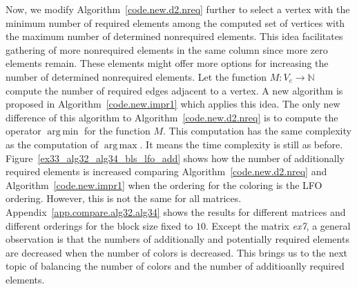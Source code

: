 \documentclass[12pt, twoside,a4paper,toc=bibliography]{scrbook}
\DeclareMathOperator*{\argmin}{arg\,min}
\DeclareMathOperator*{\argmax}{arg\,max}
\newcommand{\figref}[1]{Figure~\protect\ref{#1}}
\newcommand{\coderef}[1]{Algorithm~\protect\ref{#1}}
\newcommand{\appref}[1]{Appendix~\protect\ref{#1}}
\newcommand{\req}{M}
\begin{document}
Now, we modify \coderef{code.new.d2.nreq} further to select a vertex with the minimum number of 
required elements among the computed set of vertices with the maximum number of determined nonrequired elements.
This idea facilitates gathering of more nonrequired elements in the same column since
more zero elements remain. These elements might offer more options for increasing the number of determined
nonrequired elements.
Let the function $\req: V_c\rightarrow \mathbb{N}$ compute the number of required edges adjacent to a vertex.
A new algorithm is proposed in \coderef{code.new.impr1} which applies this idea. 
The only new difference of this algorithm to \coderef{code.new.d2.nreq} 
is to compute the operator $\argmin$ for the 
function $\req$. This computation has the same complexity as the computation of $\argmax$.
It means the time complexity is still as before.
\figref{ex33_alg32_alg34_bls_lfo_add} shows how the number of additionally
required elements is increased comparing
\coderef{code.new.d2.nreq} and \coderef{code.new.impr1} when the ordering for the coloring
is the LFO ordering. However, this is not the same for all matrices. 
\appref{app.compare.alg32.alg34} shows the results for different matrices
and different orderings for the block size fixed to $10$.
Except the matrix \textit{ex7},
a general observation is that the numbers of additionally and potentially required elements
are decreased when the number of colors is decreased.
This brings us to the next topic of balancing the number of colors
and the number of additioanlly required elements.
\end{document}
